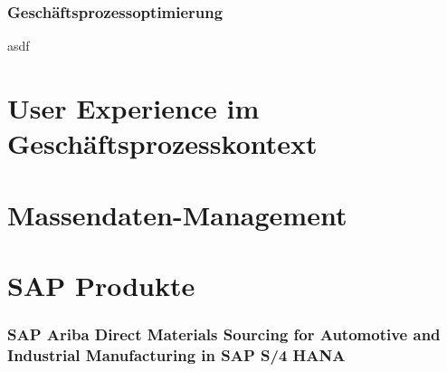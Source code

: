 


\subsubsection{Geschäftsprozessoptimierung}

asdf

\section{User Experience im Geschäftsprozesskontext}


\section{Massendaten-Management}


\section{SAP Produkte}

\subsubsection{SAP Ariba Direct Materials Sourcing for Automotive and Industrial Manufacturing in SAP S/4 HANA}

